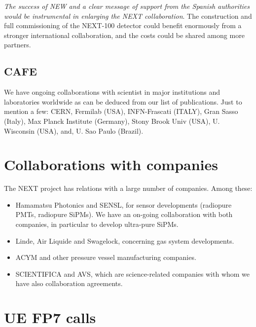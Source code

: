 \documentclass[a4paper,11pt,oneside]{article}
\begin{document}
{\em The success of NEW and a clear message of support from the Spanish authorities would be instrumental in enlarging the NEXT collaboration}. The construction and full commissioning of the NEXT-100 detector could benefit enormously from a stronger international collaboration, and the costs could be shared among more partners. 

\subsection*{CAFE}

We have ongoing collaborations with scientist in major institutions
and laboratories worldwide as can be deduced from our list
of publications. Just to mention a few: CERN, Fermilab (USA), 
INFN-Frascati (ITALY), Gran Sasso (Italy), Max Planck Institute (Germany),
Stony Brook Univ (USA), U. Wisconsin (USA), and, U. Sao Paulo (Brazil). 

\section{\bf \textsf{Collaborations with companies}}

The NEXT project has relations with a large number of companies. Among these:
\begin{itemize}
\item Hamamatsu Photonics and SENSL, for sensor developments (radiopure PMTs, radiopure SiPMs). We have an on-going collaboration with both companies, in particular to develop ultra-pure SiPMs.
\item Linde, Air Liquide and Swagelock, concerning gas system developments. 
\item ACYM and other pressure vessel manufacturing companies. 
\item SCIENTIFICA and AVS, which are science-related companies with whom we have also collaboration agreements. 
\end{itemize}


\section{\bf \textsf{UE FP7 calls}}
\end{document}
